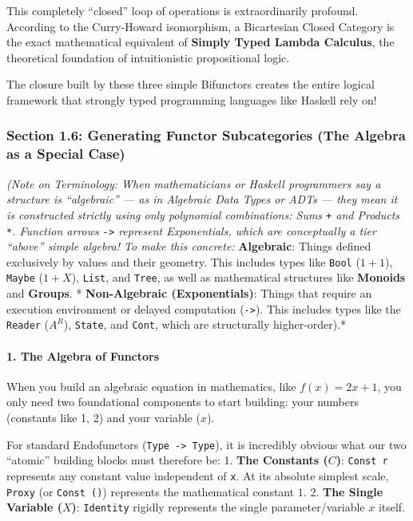 \documentclass[
]{article}
\begin{document}
This completely ``closed'' loop of operations is extraordinarily
profound. According to the Curry-Howard isomorphism, a Bicartesian
Closed Category is the exact mathematical equivalent of \textbf{Simply
Typed Lambda Calculus}, the theoretical foundation of intuitionistic
propositional logic.

The closure built by these three simple Bifunctors creates the entire
logical framework that strongly typed programming languages like Haskell
rely on!

\subsubsection{Section 1.6: Generating Functor Subcategories (The
Algebra as a Special
Case)}\label{section-1.6-generating-functor-subcategories-the-algebra-as-a-special-case}

\emph{(Note on Terminology: When mathematicians or Haskell programmers
say a structure is ``algebraic'' --- as in Algebraic Data Types or ADTs
--- they mean it is constructed strictly using only polynomial
combinations: Sums \texttt{+} and Products \texttt{*}. Function arrows
\texttt{-\textgreater{}} represent Exponentials, which are conceptually
a tier ``above'' simple algebra! To make this concrete: }
\textbf{Algebraic}: Things defined exclusively by values and their
geometry. This includes types like \texttt{Bool} (\(1 + 1\)),
\texttt{Maybe} (\(1 + X\)), \texttt{List}, and \texttt{Tree}, as well as
mathematical structures like \textbf{Monoids} and \textbf{Groups}. *
\textbf{Non-Algebraic (Exponentials)}: Things that require an execution
environment or delayed computation (\texttt{-\textgreater{}}). This
includes types like the \texttt{Reader} (\(A^R\)), \texttt{State}, and
\texttt{Cont}, which are structurally higher-order).*

\paragraph{1. The Algebra of Functors}\label{the-algebra-of-functors}

When you build an algebraic equation in mathematics, like
\(f(x) = 2x + 1\), you only need two foundational components to start
building: your numbers (constants like 1, 2) and your variable (\(x\)).

For standard Endofunctors (\texttt{Type\ -\textgreater{}\ Type}), it is
incredibly obvious what our two ``atomic'' building blocks must
therefore be: 1. \textbf{The Constants (\(C\))}: \texttt{Const\ r}
represents any constant value independent of \texttt{x}. At its absolute
simplest scale, \texttt{Proxy} (or \texttt{Const\ ()}) represents the
mathematical constant \(1\). 2. \textbf{The Single Variable (\(X\))}:
\texttt{Identity} rigidly represents the single parameter/variable \(x\)
itself.
\end{document}
